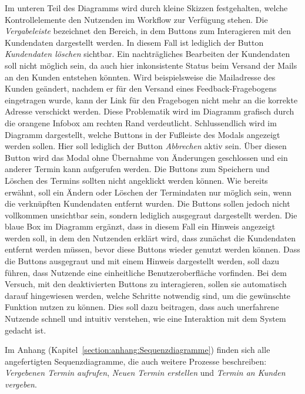 Im unteren Teil des Diagramms wird durch kleine Skizzen festgehalten, welche
Kontrollelemente den Nutzenden im Workflow zur Verfügung stehen. Die
\textit{Vergabeleiste} bezeichnet den Bereich, in dem Buttons zum Interagieren
mit den Kundendaten dargestellt werden. In diesem Fall ist lediglich der Button
\textit{Kundendaten löschen} sichtbar. Ein nachträgliches Bearbeiten der
Kundendaten soll nicht möglich sein, da auch hier inkonsistente Status beim
Versand der Mails an den Kunden entstehen könnten. Wird beispielsweise die
Mailadresse des Kunden geändert, nachdem er für den Versand eines
Feedback-Fragebogens eingetragen wurde, kann der Link für den Fragebogen nicht
mehr an die korrekte Adresse verschickt werden. Diese Problematik wird im
Diagramm grafisch durch die orangene Infobox am rechten Rand verdeutlicht.
Schlussendlich wird im Diagramm dargestellt, welche Buttons in der Fußleiste
des Modals angezeigt werden sollen. Hier soll lediglich der Button
\textit{Abbrechen} aktiv sein. Über diesen Button wird das Modal ohne Übernahme
von Änderungen geschlossen und ein anderer Termin kann aufgerufen werden. Die
Buttons zum Speichern und Löschen des Termins sollten nicht angeklickt werden
können. Wie bereits erwähnt, soll ein Ändern oder Löschen der Termindaten nur
möglich sein, wenn die verknüpften Kundendaten entfernt wurden. Die Buttons
sollen jedoch nicht vollkommen unsichtbar sein, sondern lediglich ausgegraut
dargestellt werden. Die blaue Box im Diagramm ergänzt, dass in diesem Fall ein
Hinweis angezeigt werden soll, in dem den Nutzenden erklärt wird, dass zunächst
die Kundendaten entfernt werden müssen, bevor diese Buttons wieder genutzt
werden können. Dass die Buttons ausgegraut und mit einem Hinweis dargestellt
werden, soll dazu führen, dass Nutzende eine einheitliche Benutzeroberfläche
vorfinden. Bei dem Versuch, mit den deaktivierten Buttons zu interagieren,
sollen sie automatisch darauf hingewiesen werden, welche Schritte notwendig
sind, um die gewünschte Funktion nutzen zu können. Dies soll dazu beitragen,
dass auch unerfahrene Nutzende schnell und intuitiv verstehen, wie eine
Interaktion mit dem System gedacht ist.

Im Anhang (Kapitel~\ref{section:anhang:Sequenzdiagramme}) finden sich alle angefertigten Sequenzdiagramme, die auch weitere Prozesse beschreiben: \textit{Vergebenen
    Termin aufrufen}, \textit{Neuen Termin erstellen} und \textit{Termin an Kunden
    vergeben}.

